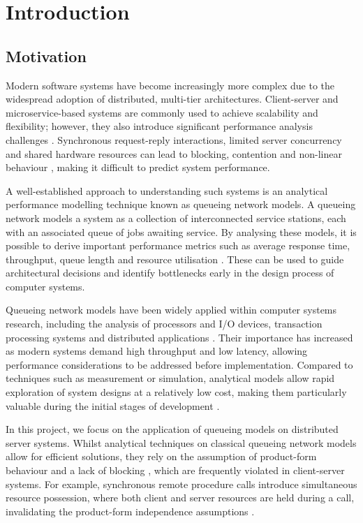 \chapter{Introduction}

\section{Motivation}

Modern software systems have become increasingly more complex due to the widespread adoption of distributed, multi-tier architectures. Client-server and microservice-based systems \cite{lewis2014microservices} are commonly used to achieve scalability and flexibility; however, they also introduce significant performance analysis challenges \cite{heinrich2017}. Synchronous request-reply interactions, limited server concurrency and shared hardware resources can lead to blocking, contention and non-linear behaviour \cite{urgaonkar2005}, making it difficult to predict system performance.

A well-established approach to understanding such systems is an analytical performance modelling technique known as queueing network models. A queueing network models a system as a collection of interconnected service stations, each with an associated queue of jobs awaiting service. By analysing these models, it is possible to derive important performance metrics such as average response time, throughput, queue length and resource utilisation \cite{lazowska84}. These can be used to guide architectural decisions and identify bottlenecks early in the design process of computer systems.

Queueing network models have been widely applied within computer systems research, including the analysis of processors and I/O devices, transaction processing systems and distributed applications \cite{lazowska84}. Their importance has increased as modern systems demand high throughput and low latency, allowing performance considerations to be addressed before implementation. Compared to techniques such as measurement or simulation, analytical models allow rapid exploration of system designs at a relatively low cost, making them particularly valuable during the initial stages of development \cite{franks99}.

In this project, we focus on the application of queueing models on distributed server systems. 
Whilst analytical techniques on classical queueing network models allow for efficient solutions, they rely on the assumption of product-form behaviour and a lack of blocking \cite{lazowska84}, which are frequently violated in client-server systems. For example, synchronous remote procedure calls introduce simultaneous resource possession, where both client and server resources are held during a call, invalidating the product-form independence assumptions \cite{franks99}.

